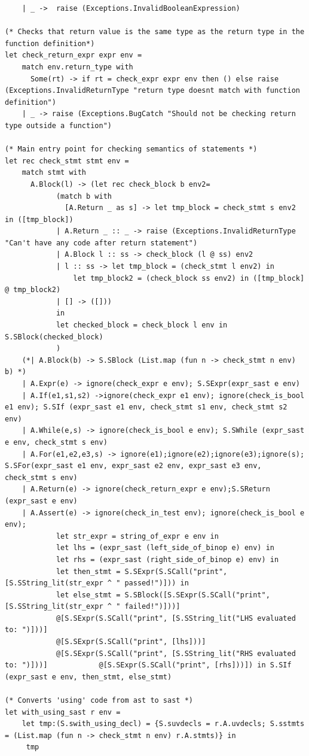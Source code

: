 \documentclass{article}
\begin{document}
\begin{lstlisting}
	| _ ->  raise (Exceptions.InvalidBooleanExpression)

(* Checks that return value is the same type as the return type in the function definition*)
let check_return_expr expr env = 
	match env.return_type with
	  Some(rt) -> if rt = check_expr expr env then () else raise (Exceptions.InvalidReturnType "return type doesnt match with function definition")
	| _ -> raise (Exceptions.BugCatch "Should not be checking return type outside a function")

(* Main entry point for checking semantics of statements *)
let rec check_stmt stmt env = 
	match stmt with
	  A.Block(l) -> (let rec check_block b env2=
			(match b with
			  [A.Return _ as s] -> let tmp_block = check_stmt s env2 in ([tmp_block]) 
			| A.Return _ :: _ -> raise (Exceptions.InvalidReturnType "Can't have any code after return statement")
			| A.Block l :: ss -> check_block (l @ ss) env2
			| l :: ss -> let tmp_block = (check_stmt l env2) in 
				let tmp_block2 = (check_block ss env2) in ([tmp_block] @ tmp_block2)
			| [] -> ([]))
			in
			let checked_block = check_block l env in S.SBlock(checked_block)
			) 
	(*| A.Block(b) -> S.SBlock (List.map (fun n -> check_stmt n env) b) *)
	| A.Expr(e) -> ignore(check_expr e env); S.SExpr(expr_sast e env)
	| A.If(e1,s1,s2) ->ignore(check_expr e1 env); ignore(check_is_bool e1 env); S.SIf (expr_sast e1 env, check_stmt s1 env, check_stmt s2 env)
	| A.While(e,s) -> ignore(check_is_bool e env); S.SWhile (expr_sast e env, check_stmt s env)
	| A.For(e1,e2,e3,s) -> ignore(e1);ignore(e2);ignore(e3);ignore(s); S.SFor(expr_sast e1 env, expr_sast e2 env, expr_sast e3 env, check_stmt s env) 
	| A.Return(e) -> ignore(check_return_expr e env);S.SReturn (expr_sast e env)
	| A.Assert(e) -> ignore(check_in_test env); ignore(check_is_bool e env); 
			let str_expr = string_of_expr e env in  
			let lhs = (expr_sast (left_side_of_binop e) env) in
			let rhs = (expr_sast (right_side_of_binop e) env) in
			let then_stmt = S.SExpr(S.SCall("print", [S.SString_lit(str_expr ^ " passed!")])) in 
			let else_stmt = S.SBlock([S.SExpr(S.SCall("print", [S.SString_lit(str_expr ^ " failed!")]))]
			@[S.SExpr(S.SCall("print", [S.SString_lit("LHS evaluated to: ")]))]
			@[S.SExpr(S.SCall("print", [lhs]))]
			@[S.SExpr(S.SCall("print", [S.SString_lit("RHS evaluated to: ")]))]			   @[S.SExpr(S.SCall("print", [rhs]))]) in S.SIf (expr_sast e env, then_stmt, else_stmt)

(* Converts 'using' code from ast to sast *)
let with_using_sast r env = 
	let tmp:(S.swith_using_decl) = {S.suvdecls = r.A.uvdecls; S.sstmts = (List.map (fun n -> check_stmt n env) r.A.stmts)} in
	 tmp


\end{lstlisting}
\end{document}
